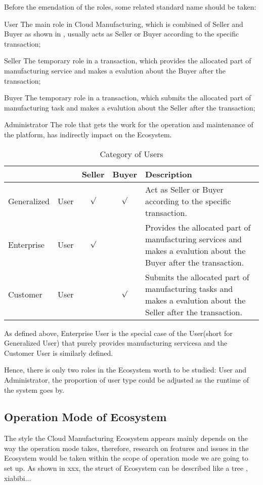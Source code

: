 Before the emendation of the roles, some related standard name should be taken:
\begin{asparadesc}
\item[User] The main role in Cloud Manufacturing, which is combined of Seller and Buyer as shown in , usually acts as Seller or Buyer according to the specific transaction;
\item[Seller] The temporary role in a transaction, which provides the allocated part of manufacturing service and makes a evalution about the Buyer after the transaction;
\item[Buyer] The temporary role in a transaction, which submits the allocated part of manufacturing task and makes a evalution about the Seller after the transaction;
\item[Administrator] The role that gets the work for the operation and maintenance of the platform, has indirectly impact on the Ecosystem.
\end{asparadesc}
\begin{table}[htbp]
  \centering\small
  \caption{Category of Users}
    \begin{tabularx}{\textwidth}{llccX}
    \toprule
        &  & Seller & Buyer & Description \\
    \midrule
    Generalized & User & $\surd$ & $\surd$ & Act as Seller or Buyer according to the specific transaction. \\
    Enterprise & User & $\surd$ & &  Provides the allocated part of manufacturing services and makes a evalution about the Buyer after the transaction. \\
    Customer & User& & $\surd$ &  Submits the allocated part of manufacturing tasks and makes a evalution about the Seller after the transaction.\\
    \bottomrule
    \end{tabularx}%
  \label{tab:categoryuser}%
\end{table}%
As defined above, Enterprise User is the special case of the User(short for Generalized User) that purely provides manufacturing servicesa and the Customer User is similarly defined.

Hence, there is only two roles in the Ecosystem worth to be studied: User and Administrator, the proportion of user type could be adjusted as the runtime of the system goes by.

\subsection{Operation Mode of Ecosystem}
The style the Cloud Manufacturing Ecosystem appears mainly depends on the way the operation mode takes, therefore, research on features and issues in the Ecosystem would be taken within the scope of operation mode we are going to set up. As shown in xxx, the struct of Ecosystem can be described like a tree ,  xiabibi...

